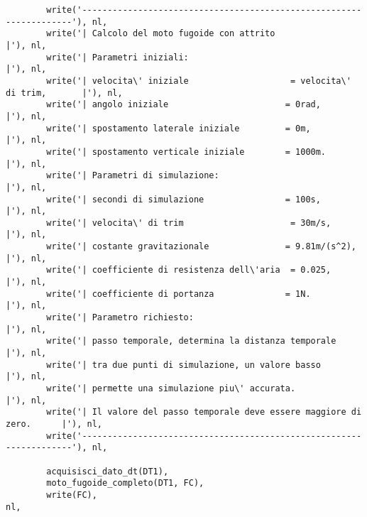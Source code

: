 \begin{verbatim}
        write('--------------------------------------------------------------------'), nl,
        write('| Calcolo del moto fugoide con attrito                             |'), nl,
        write('| Parametri iniziali:                                              |'), nl,
        write('| velocita\' iniziale                    = velocita\' di trim,       |'), nl,
        write('| angolo iniziale                       = 0rad,                    |'), nl,
        write('| spostamento laterale iniziale         = 0m,                      |'), nl,
        write('| spostamento verticale iniziale        = 1000m.                   |'), nl,
        write('| Parametri di simulazione:                                        |'), nl,
        write('| secondi di simulazione                = 100s,                    |'), nl,
        write('| velocita\' di trim                     = 30m/s,                   |'), nl,
        write('| costante gravitazionale               = 9.81m/(s^2),             |'), nl,
        write('| coefficiente di resistenza dell\'aria  = 0.025,                   |'), nl,
        write('| coefficiente di portanza              = 1N.                      |'), nl,
        write('| Parametro richiesto:                                             |'), nl,
        write('| passo temporale, determina la distanza temporale                 |'), nl,
        write('| tra due punti di simulazione, un valore basso                    |'), nl,
        write('| permette una simulazione piu\' accurata.                          |'), nl,
        write('| Il valore del passo temporale deve essere maggiore di zero.      |'), nl,
        write('--------------------------------------------------------------------'), nl,

        acquisisci_dato_dt(DT1),                                                       
        moto_fugoide_completo(DT1, FC),
        write(FC),                                                                     nl,


\end{verbatim}
